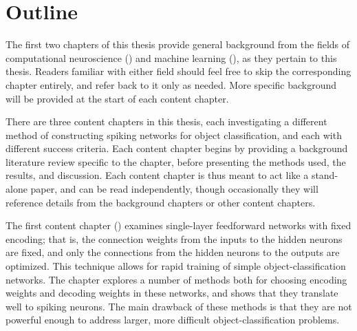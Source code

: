 









\section{Outline}

The first two chapters of this thesis provide general background from
the fields of computational neuroscience ()
and machine learning (),
as they pertain to this thesis.
Readers familiar with either field
should feel free to skip the corresponding chapter entirely,
and refer back to it only as needed.
More specific background will be provided at the start of each content chapter.

There are three content chapters in this thesis,
each investigating a different method
of constructing spiking networks for object classification,
and each with different success criteria.
Each content chapter begins by providing a background literature review
specific to the chapter,
before presenting the methods used, the results, and discussion.
Each content chapter is thus meant to act like a stand-alone paper,
and can be read independently,
though occasionally they will reference details
from the background chapters or other content chapters.

The first content chapter () examines
single-layer feedforward networks with fixed encoding;
that is, the connection weights from the inputs to the hidden neurons are fixed,
and only the connections from the hidden neurons to the outputs are optimized.
This technique allows for rapid training of simple object-classification networks.
The chapter explores a number of methods both for choosing encoding weights
and decoding weights in these networks,
and shows that they translate well to spiking neurons.
The main drawback of these methods is that they are not powerful enough
to address larger, more difficult object-classification problems.

